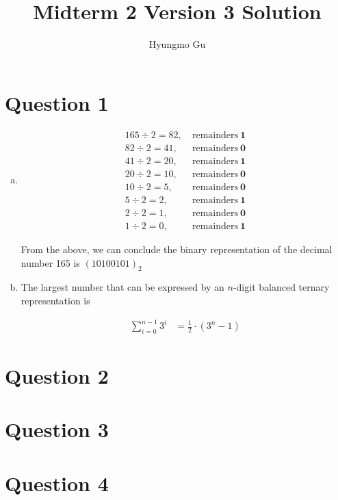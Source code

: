 \documentclass[12pt]{article}
\begin{document}
\title{Midterm 2 Version 3 Solution}
\author{Hyungmo Gu}
\maketitle

\section*{Question 1}
\begin{enumerate}[a.]
    \item

    \begin{align*}
        165 \div 2 = 82,\:&\text{remainders}\:\textbf{1}\\
        82 \div 2 = 41,\:&\text{remainders}\:\textbf{0}\\
        41 \div 2 = 20,\:&\text{remainders}\:\textbf{1}\\
        20 \div 2 = 10,\:&\text{remainders}\:\textbf{0}\\
        10 \div 2 = 5,\:&\text{remainders}\:\textbf{0}\\
        5 \div 2 = 2,\:&\text{remainders}\:\textbf{1}\\
        2 \div 2 = 1,\:&\text{remainders}\:\textbf{0}\\
        1 \div 2 = 0,\:&\text{remainders}\:\textbf{1}
    \end{align*}

    \bigskip

    From the above, we can conclude the binary representation of the decimal
    number 165 is $(10100101)_2$

    \item

    The largest number that can be expressed by an $n$-digit balanced ternary
    representation is

    \begin{align}
        \sum\limits_{i=0}^{n-1} 3^i &= \frac{1}{2} \cdot (3^n - 1)
    \end{align}

\end{enumerate}

\section*{Question 2}

\section*{Question 3}

\section*{Question 4}
\end{document}
